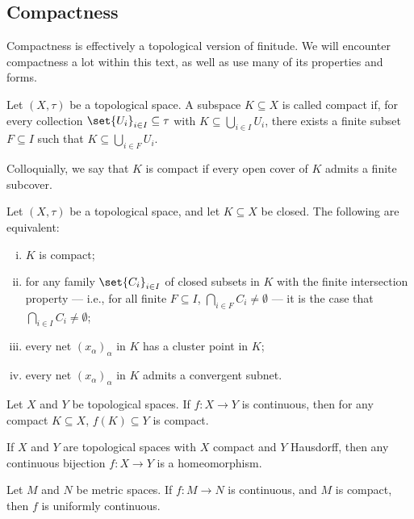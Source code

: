 \subsection{Compactness}%
Compactness is effectively a topological version of finitude. We will encounter compactness a lot within this text, as well as use many of its properties and forms.
\begin{definition}
  Let $\left(X,\tau\right)$ be a topological space. A subspace $K\subseteq X$ is called compact if, for every collection $\set{U_i}_{i\in I}\subseteq \tau$ with $K\subseteq \bigcup_{i\in I}U_i$, there exists a finite subset $F\subseteq I$ such that $K\subseteq \bigcup_{i\in F}U_i$.\newline

  Colloquially, we say that $K$ is compact if every open cover of $K$ admits a finite subcover.
\end{definition}
\begin{proposition}
  Let $\left(X,\tau\right)$ be a topological space, and let $K\subseteq X$ be closed. The following are equivalent:
  \begin{enumerate}[(i)]
    \item $K$ is compact;
    \item for any family $\set{C_i}_{i\in I}$ of closed subsets in $K$ with the finite intersection property --- i.e., for all finite $F\subseteq I$, $\bigcap_{i\in F}C_i \neq \emptyset$ --- it is the case that $\bigcap_{i\in I}C_i \neq \emptyset$;
    \item every net $\left(x_{\alpha}\right)_{\alpha}$ in $K$ has a cluster point in $K$;
    \item every net $\left(x_{\alpha}\right)_{\alpha}$ in $K$ admits a convergent subnet.
  \end{enumerate}
\end{proposition}
\begin{fact}
  Let $X$ and $Y$ be topological spaces. If $f\colon X\rightarrow Y$ is continuous, then for any compact $K\subseteq X$, $f(K)\subseteq Y$ is compact.
\end{fact}
\begin{fact}
  If $X$ and $Y$ are topological spaces with $X$ compact and $Y$ Hausdorff, then any continuous bijection $f\colon X\rightarrow Y$ is a homeomorphism.
\end{fact}
\begin{fact}
  Let $M$ and $N$ be metric spaces. If $f\colon M\rightarrow N$ is continuous, and $M$ is compact, then $f$ is uniformly continuous.
\end{fact}

